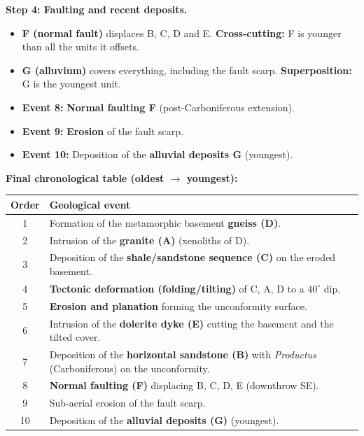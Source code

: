 \documentclass[11pt]{article}
\begin{document}
\begin{exoresolu}
\textbf{Step 4: Faulting and recent deposits.}
\begin{itemize}
    \item \textbf{F (normal fault)} displaces B, C, D and E. \textbf{Cross-cutting:} F is younger than all the units it offsets.
    \item \textbf{G (alluvium)} covers everything, including the fault scarp. \textbf{Superposition:} G is the youngest unit.
    \item \textbf{Event 8:} \textbf{Normal faulting F} (post-Carboniferous extension).
    \item \textbf{Event 9:} \textbf{Erosion} of the fault scarp.
    \item \textbf{Event 10:} Deposition of the \textbf{alluvial deposits G} (youngest).
\end{itemize}

\textbf{Final chronological table (oldest $\rightarrow$ youngest):}

\begin{center}
\begin{tabularx}{\linewidth}{|c|X|}\hline
\rowcolor{popblueL}\textbf{Order} & \textbf{Geological event} \\ \hline
1 & Formation of the metamorphic basement \textbf{gneiss (D)}. \\ \hline
2 & Intrusion of the \textbf{granite (A)} (xenoliths of D). \\ \hline
3 & Deposition of the \textbf{shale/sandstone sequence (C)} on the eroded basement. \\ \hline
4 & \textbf{Tectonic deformation (folding/tilting)} of C, A, D to a $40^\circ$ dip. \\ \hline
5 & \textbf{Erosion and planation} forming the unconformity surface. \\ \hline
6 & Intrusion of the \textbf{dolerite dyke (E)} cutting the basement and the tilted cover. \\ \hline
7 & Deposition of the \textbf{horizontal sandstone (B)} with \emph{Productus} (Carboniferous) on the unconformity. \\ \hline
8 & \textbf{Normal faulting (F)} displacing B, C, D, E (downthrow SE). \\ \hline
9 & Sub-aerial erosion of the fault scarp. \\ \hline
10 & Deposition of the \textbf{alluvial deposits (G)} (youngest). \\ \hline
\end{tabularx}
\end{center}


\end{exoresolu}
\end{document}
